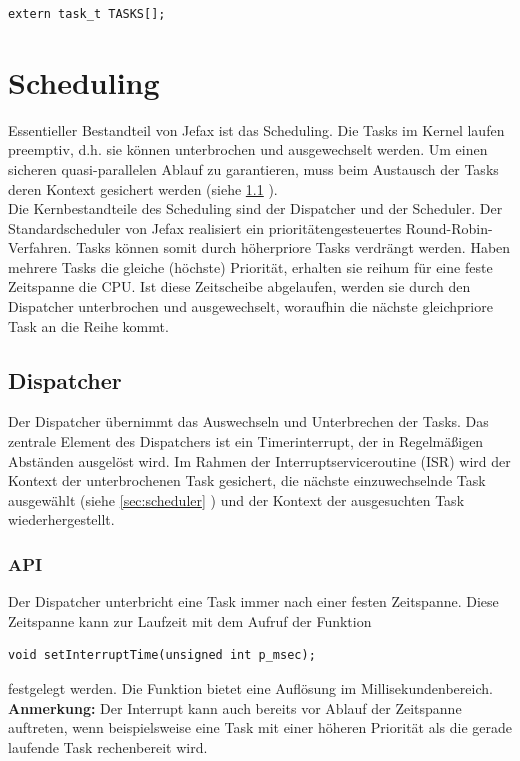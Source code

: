 \documentclass[fontsize=12pt, toc=bibliography, notitlepage]{scrreprt}
\newcommand{\refnn}[1]{\ref{#1} \nameref{#1}}
\begin{document}
\begin{lstlisting}
extern task_t TASKS[];
\end{lstlisting}

\chapter{Scheduling}
\label{chap:scheduling}
Essentieller Bestandteil von Jefax ist das Scheduling. Die Tasks im Kernel laufen preemptiv, d.h. sie können unterbrochen und ausgewechselt werden. Um einen sicheren quasi-parallelen Ablauf zu garantieren, muss beim Austausch der Tasks deren Kontext gesichert werden (siehe \refnn{sec:dispatcher}).\\
Die Kernbestandteile des Scheduling sind der Dispatcher und der Scheduler. Der Standardscheduler von Jefax realisiert ein prioritätengesteuertes Round-Robin-Verfahren. Tasks können somit durch höherpriore Tasks verdrängt werden. Haben mehrere Tasks die gleiche (höchste) Priorität, erhalten sie reihum für eine feste Zeitspanne die CPU. Ist diese Zeitscheibe abgelaufen, werden sie durch den Dispatcher unterbrochen und ausgewechselt, woraufhin die nächste gleichpriore Task an die Reihe kommt.

\section{Dispatcher}
\label{sec:dispatcher}
Der Dispatcher übernimmt das Auswechseln und Unterbrechen der Tasks. Das zentrale Element des Dispatchers ist ein Timerinterrupt, der in Regelmäßigen Abständen ausgelöst wird. Im Rahmen der Interruptserviceroutine (ISR) wird der Kontext der unterbrochenen Task gesichert, die nächste einzuwechselnde Task ausgewählt (siehe \refnn{sec:scheduler}) und der Kontext der ausgesuchten Task wiederhergestellt. 

\subsection{API}
\label{subsec:dispatcher-api}
Der Dispatcher unterbricht eine Task immer nach einer festen Zeitspanne. Diese Zeitspanne kann zur Laufzeit mit dem Aufruf der Funktion 

\begin{lstlisting}[title=dispatcher.h]
void setInterruptTime(unsigned int p_msec);
\end{lstlisting}

festgelegt werden. Die Funktion bietet eine Auflösung im Millisekundenbereich.\\
\textbf{Anmerkung:} Der Interrupt kann auch bereits vor Ablauf der Zeitspanne auftreten, wenn beispielsweise eine Task mit einer höheren Priorität als die gerade laufende Task rechenbereit wird.
\end{document}
